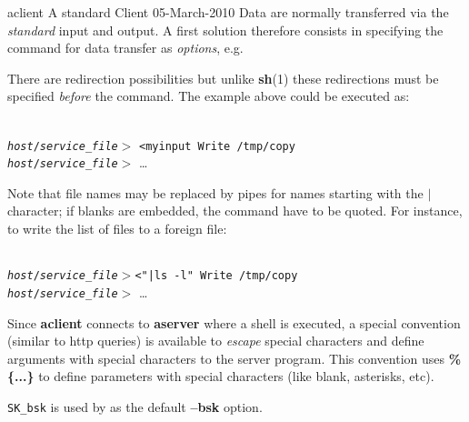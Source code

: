 \begin{manpage}{1}{aclient} {A standard Client} {05-March-2010}
	Data are normally transferred via the {\em standard} input and
	output. A first solution therefore consists 
	in specifying the command for data transfer as {\em options}, e.g.


	There are redirection possibilities but unlike {\bf sh}(1)
	these redirections must be specified {\em before} the command.
	The example above could be executed as:
	
	\begin{raggedright}
	\\
	{\tt{\em host}/{\em service\_file}$>$} {\tt <myinput Write /tmp/copy}\\
	{\tt{\em host}/{\em service\_file}$>$} \dots
	\end{raggedright}

	Note that file names may be replaced by pipes for names starting
	with the $|$ character; if blanks are embedded, the command have
	to be quoted. For instance, to write the list of files
	to a foreign file:
	\begin{raggedright}
	\\
	{\tt{\em host}/{\em service\_file}$>$}{\tt <"|ls -l" Write /tmp/copy}\\
	{\tt{\em host}/{\em service\_file}$>$} \dots
	\end{raggedright}

	Since {\bf aclient} connects to {\bf aserver} where a shell
	is executed, a special convention (similar to http queries)
	is available to {\em escape} special characters and
	define arguments with special characters to the server
	program. This convention uses {\bf\%\{...\}} to define
	parameters with special characters (like blank, asterisks, etc).


	{\tt SK\_bsk} is used by \pgm as the default {\bf --bsk} option.


\end{manpage}

